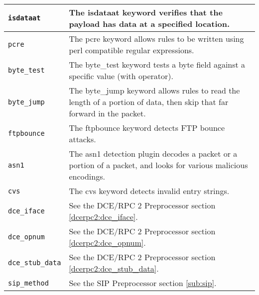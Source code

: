\documentclass[english]{report}
\begin{document}
\begin{center}
\begin{longtable}[h]{| p{1in} | p{4.5in} |}
\hline
\texttt{isdataat} &

The isdataat keyword verifies that the payload has data at a specified
location. \\

\hline
\texttt{pcre} &

The pcre keyword allows rules to be written using perl compatible regular
expressions. \\

\hline
\texttt{byte\_test} &

The byte\_test keyword tests a byte field against a specific value (with
operator). \\

\hline
\texttt{byte\_jump} &

The byte\_jump keyword allows rules to read the length of a portion of data,
then skip that far forward in the packet. \\

\hline
\texttt{ftpbounce} &

The ftpbounce keyword detects FTP bounce attacks. \\


\hline
\texttt{asn1} &

The asn1 detection plugin decodes a packet or a portion of a packet, and looks
for various malicious encodings. \\

\hline
\texttt{cvs} &

The cvs keyword detects invalid entry strings. \\

\hline
\texttt{dce\_iface} &

See the DCE/RPC 2 Preprocessor section \ref{dcerpc2:dce_iface}. \\

\hline
\texttt{dce\_opnum} &

See the DCE/RPC 2 Preprocessor section \ref{dcerpc2:dce_opnum}. \\

\hline
\texttt{dce\_stub\_data} &

See the DCE/RPC 2 Preprocessor section \ref{dcerpc2:dce_stub_data}. \\

\hline
\texttt{sip\_method} &

See the SIP Preprocessor section \ref{sub:sip}. \\


\end{longtable}
\end{center}
\end{document}
